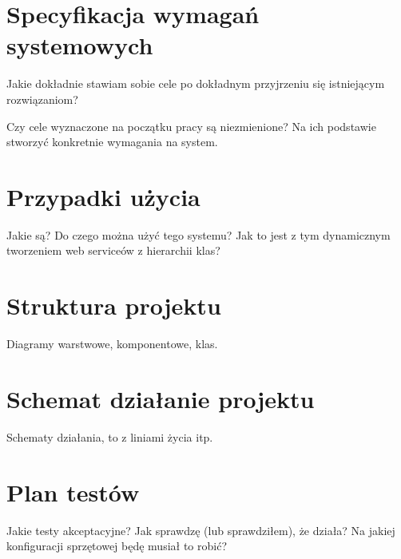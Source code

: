 \section{Specyfikacja wymagań systemowych}
Jakie dokładnie stawiam sobie cele po dokładnym przyjrzeniu się istniejącym rozwiązaniom?

Czy cele wyznaczone na początku pracy są niezmienione? Na ich podstawie stworzyć konkretnie wymagania na system.

%

\section{Przypadki użycia}
Jakie są? Do czego można użyć tego systemu? Jak to jest z tym dynamicznym tworzeniem web serviceów z hierarchii klas?

\section{Struktura projektu}
Diagramy warstwowe, komponentowe, klas.

\section{Schemat działanie projektu}
Schematy działania, to z liniami życia itp.

\section{Plan testów}
Jakie testy akceptacyjne? Jak sprawdzę (lub sprawdziłem), że działa? Na jakiej konfiguracji sprzętowej będę musiał to robić?